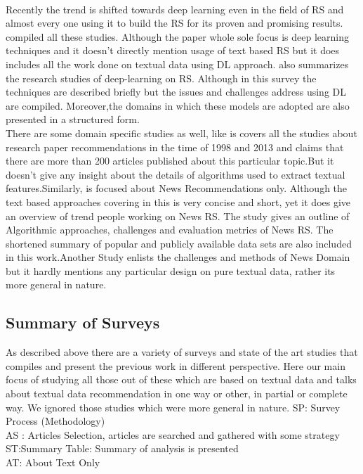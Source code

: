 \\Recently the trend is shifted towards deep learning even in the field of RS and almost every one using it to build the RS for its proven and promising results.\cite{DeepLearning-Srvey} compiled all these studies. Although the paper whole sole focus is deep learning techniques and it doesn't directly mention usage of text based RS but it does includes all the work done on textual data using DL approach.\cite{p3} also summarizes the research studies of deep-learning on RS. Although in this survey the techniques are described briefly but the issues and challenges address using DL are compiled. Moreover,the domains in which these models are adopted are also presented in a structured form.  \\
There are some domain specific studies as well, like\cite{p6} is covers all the studies about research paper recommendations in the time of 1998 and 2013 and claims that there are more than 200 articles published about this particular topic.But it doesn't give any insight about the details of algorithms used to extract textual features.Similarly, \cite{p4} is focused about News Recommendations only. Although the text based approaches covering in this is very concise and short, yet it does give an overview of trend people working on News RS. The study gives an outline of Algorithmic approaches, challenges and evaluation metrics of News RS. The shortened summary of popular and publicly available data sets are also included in this work.Another Study \cite{p5} enlists the challenges and methods of News Domain but it hardly mentions any particular design on pure textual data, rather its more general in nature.

\subsection{Summary of Surveys}
As described above there are a variety of surveys and state of the art studies that compiles and present the previous work in different perspective. Here our main focus of studying all those out of these which are based on textual data and talks about textual data recommendation in one way or other, in partial or complete way. We ignored those studies which were more general in nature.
SP: Survey Process (Methodology)
\\AS : Articles Selection, articles are searched and gathered with some strategy
\\ST:Summary Table: Summary of analysis is presented
\\AT: About Text Only

